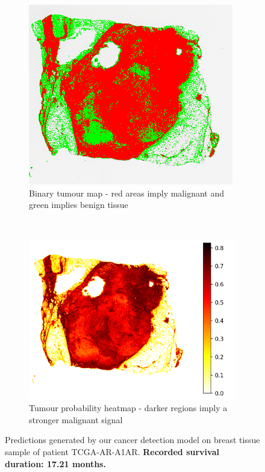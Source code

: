 \documentclass{l4proj}
\begin{document}
\begin{appendices}
\begin{figure}[hbt!]
    \centering
    \begin{subfigure}[b]{0.4\textwidth}
        \includegraphics[scale=0.7]{images/appendix_b/TCGA-AR-A1AR-mss.png}
        \vspace{0.5cm}
        \caption{Binary tumour map - red areas imply malignant and green implies benign tissue}
    \end{subfigure}\hfill%
    ~~
    \begin{subfigure}[b]{0.4\textwidth}
        \includegraphics[scale=0.6]{images/appendix_b/TCGA-AR-A1AR-mmi.png}
        \caption{Tumour probability heatmap - darker regions imply a stronger malignant signal}
    \end{subfigure}

    \caption{Predictions generated by our cancer detection model on breast tissue sample of patient TCGA-AR-A1AR. \textbf{Recorded survival duration: 17.21 months.}}
    \label{fig:TCGA-AR-A1AR}
\end{figure}


\end{appendices}
\end{document}
